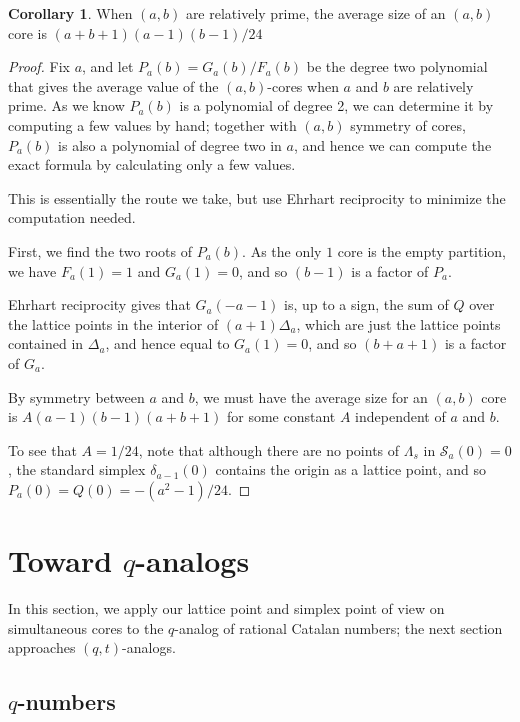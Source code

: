 \documentclass{amsart}[12pt]
\theoremstyle{definition}
\newtheorem{corollary}[dummy]{Corollary}
\begin{document}
\begin{corollary}
When $(a,b)$ are relatively prime, the average size of an $(a,b)$ core is $(a+b+1)(a-1)(b-1)/24$
\end{corollary}

\begin{proof}

Fix $a$, and let $P_a(b)=G_a(b)/F_a(b)$ be the degree two polynomial that
gives the average value of the $(a,b)$-cores when $a$ and $b$ are
relatively prime.  As we know $P_a(b)$ is a polynomial of degree 2, we can determine it by computing a few values by hand; together with $(a,b)$ symmetry of cores, $P_a(b)$ is also a polynomial of degree two in $a$, and hence we can compute the exact formula by calculating only a few values.



This is essentially the route we take, but use Ehrhart reciprocity to minimize the computation needed.

First, we find the two roots of $P_a(b)$.  As the only $1$ core is the empty partition, we have $F_a(1)=1$ and $G_a(1)=0$, and so
$(b-1)$ is a factor of $P_a$.

Ehrhart reciprocity gives that
$G_a(-a-1)$ is, up to a sign, the sum of $Q$ over the lattice points in the
interior of $(a+1)\Delta_a$, which are just the lattice points contained in $\Delta_a$, and hence equal to $G_a(1)=0$, and so $(b+a+1)$ is a factor of $G_a$.

By symmetry between $a$ and $b$, we must have the average size for an $(a,b)$ core is $A(a-1)(b-1)(a+b+1)$ for some
constant $A$ independent of $a$ and $b$.

To see that $A=1/24$, note that although there are no points of $\Lambda_s$ in $\mathcal{S}_a(0)=0$, the standard simplex $\delta_{a-1}(0)$ contains the origin as a lattice point, and so $P_a(0)=Q(0)=-(a^2-1)/24$.
\end{proof}



\section{Toward \texorpdfstring{$q$}{q}-analogs}
In this section, we apply our lattice point and simplex point of view on simultaneous cores to the $q$-analog of rational Catalan numbers; the next section approaches $(q,t)$-analogs.

\subsection{\texorpdfstring{$q$}{q}-numbers}
\end{document}
